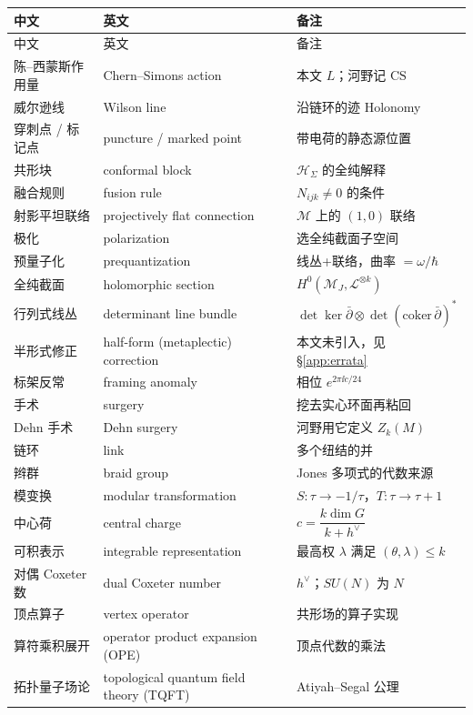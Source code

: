 \begin{center}
\small
\begin{longtable}{@{}p{3.1cm}p{5.1cm}p{5.9cm}@{}}
\toprule
中文 & 英文 & 备注 \\
\midrule
\endfirsthead
\toprule
中文 & 英文 & 备注 \\
\midrule
\endhead
陈--西蒙斯作用量 & Chern--Simons action & 本文 $L$；河野记 $\mathrm{CS}$ \\
威尔逊线 & Wilson line & 沿链环的迹 Holonomy \\
穿刺点 / 标记点 & puncture / marked point & 带电荷的静态源位置 \\
共形块 & conformal block & $\mathcal H_\Sigma$ 的全纯解释 \\
融合规则 & fusion rule & $N_{ijk}\neq0$ 的条件 \\
射影平坦联络 & projectively flat connection & $\mathcal M$ 上的 $(1,0)$ 联络 \\
极化 & polarization & 选全纯截面子空间 \\
预量子化 & prequantization & 线丛+联络，曲率 $=\omega/\hbar$ \\
全纯截面 & holomorphic section & $H^0(\mathcal M_J,\mathcal L^{\otimes k})$ \\
行列式线丛 & determinant line bundle & $\det\ker\bar\partial\otimes\det(\mathrm{coker}\,\bar\partial)^*$ \\
半形式修正 & half-form (metaplectic) correction & 本文未引入，见 \S\ref{app:errata} \\
标架反常 & framing anomaly & 相位 $e^{2\pi\ii c/24}$ \\
手术 & surgery & 挖去实心环面再粘回 \\
Dehn 手术 & Dehn surgery & 河野用它定义 $Z_k(M)$ \\
链环 & link & 多个纽结的并 \\
辫群 & braid group & Jones 多项式的代数来源 \\
模变换 & modular transformation & $S:\tau\to-1/\tau$，$T:\tau\to\tau+1$ \\
中心荷 & central charge & $c=\dfrac{k\dim G}{k+h^\vee}$ \\
可积表示 & integrable representation & 最高权 $\lambda$ 满足 $(\theta,\lambda)\le k$ \\
对偶 Coxeter 数 & dual Coxeter number & $h^\vee$；$SU(N)$ 为 $N$ \\
顶点算子 & vertex operator & 共形场的算子实现 \\
算符乘积展开 & operator product expansion (OPE) & 顶点代数的乘法 \\
拓扑量子场论 & topological quantum field theory (TQFT) & Atiyah--Segal 公理 \\
\bottomrule
\end{longtable}
\end{center}

